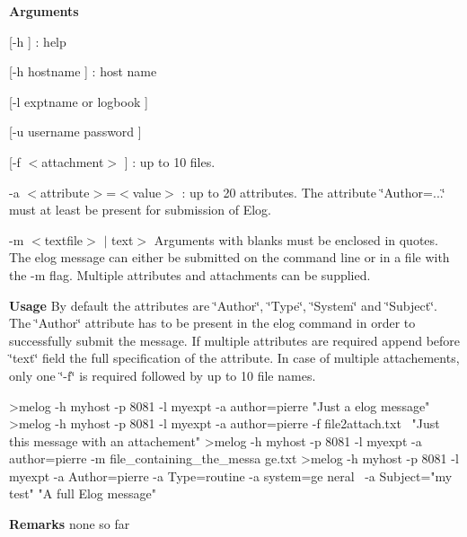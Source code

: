 \begin{DoxyItemize}
\item {\bfseries  Arguments }
\begin{DoxyItemize}
\item \mbox{[}-\/h \mbox{]} : help
\item \mbox{[}-\/h hostname \mbox{]} : host name
\item \mbox{[}-\/l exptname or logbook \mbox{]}
\item \mbox{[}-\/u username password \mbox{]}
\item \mbox{[}-\/f $<$attachment$>$ \mbox{]} : up to 10 files.
\item -\/a $<$attribute$>$=$<$value$>$ : up to 20 attributes. The attribute \char`\"{}Author=...\char`\"{} must at least be present for submission of Elog.
\item -\/m $<$textfile$>$ $|$ text$>$ Arguments with blanks must be enclosed in quotes. The elog message can either be submitted on the command line or in a file with the -\/m flag. Multiple attributes and attachments can be supplied.
\end{DoxyItemize}
\end{DoxyItemize}


\begin{DoxyItemize}
\item {\bfseries  Usage } By default the attributes are \char`\"{}Author\char`\"{}, \char`\"{}Type\char`\"{}, \char`\"{}System\char`\"{} and \char`\"{}Subject\char`\"{}. The \char`\"{}Author\char`\"{} attribute has to be present in the elog command in order to successfully submit the message. If multiple attributes are required append before \char`\"{}text\char`\"{} field the full specification of the attribute. In case of multiple attachements, only one \char`\"{}-\/f\char`\"{} is required followed by up to 10 file names. 
\begin{DoxyCode}
 >melog -h myhost -p 8081 -l myexpt -a author=pierre "Just a elog message"
 >melog -h myhost -p 8081 -l myexpt -a author=pierre -f file2attach.txt \
                 "Just this message with an attachement"
 >melog -h myhost -p 8081 -l myexpt -a author=pierre -m file_containing_the_messa
      ge.txt
 >melog -h myhost -p 8081 -l myexpt -a Author=pierre -a Type=routine -a system=ge
      neral \
                 -a Subject="my test" "A full Elog message"
\end{DoxyCode}

\item {\bfseries  Remarks } none so far
\end{DoxyItemize}



